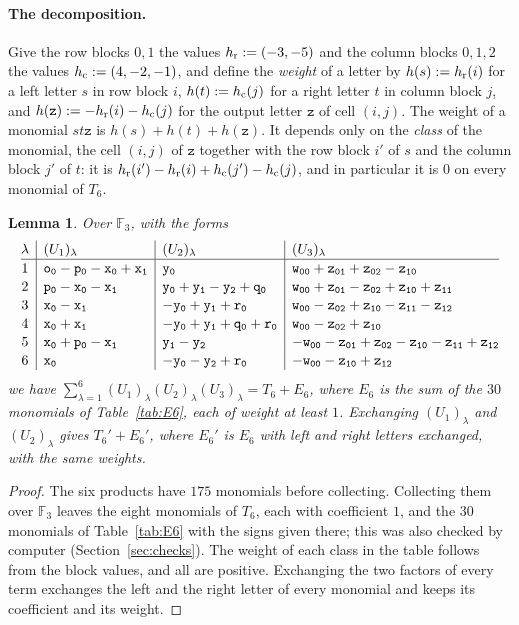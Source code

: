 \documentclass[11pt]{article}
\newtheorem{lemma}[theorem]{Lemma}
\theoremstyle{definition}
\theoremstyle{remark}
\newcommand{\F}{\mathbb{F}}
\newcommand{\tl}[1]{\mathtt{#1}}
\begin{document}
\paragraph{The decomposition.} Give the row blocks $0,1$ the values $h_{\rm r}:=(-3,-5)$ and the column blocks $0,1,2$ the values $h_{\rm c}:=(4,-2,-1)$, and define the \emph{weight} of a letter by $h(s):=h_{\rm r}(i)$ for a left letter $s$ in row block $i$, $h(t):=h_{\rm c}(j)$ for a right letter $t$ in column block $j$, and $h(\tl z):=-h_{\rm r}(i)-h_{\rm c}(j)$ for the output letter $\tl z$ of cell $(i,j)$. The weight of a monomial $st\tl z$ is $h(s)+h(t)+h(\tl z)$. It depends only on the \emph{class} of the monomial, the cell $(i,j)$ of $\tl z$ together with the row block $i'$ of $s$ and the column block $j'$ of $t$: it is $h_{\rm r}(i')-h_{\rm r}(i)+h_{\rm c}(j')-h_{\rm c}(j)$, and in particular it is $0$ on every monomial of $T_6$.

\begin{lemma}\label{lem:T6}
Over $\F_3$, with the forms
\[
\renewcommand{\arraystretch}{1.1}
\begin{array}{@{}c|l|l|l@{}}
\lambda&(U_1)_\lambda&(U_2)_\lambda&(U_3)_\lambda\\\hline
1&\tl{o_0}-\tl{p_0}-\tl{x_0}+\tl{x_1}&\tl{y_0}&\tl{w_{00}}+\tl{z_{01}}+\tl{z_{02}}-\tl{z_{10}}\\
2&\tl{p_0}-\tl{x_0}-\tl{x_1}&\tl{y_0}+\tl{y_1}-\tl{y_2}+\tl{q_0}&\tl{w_{00}}+\tl{z_{01}}-\tl{z_{02}}+\tl{z_{10}}+\tl{z_{11}}\\
3&\tl{x_0}-\tl{x_1}&-\tl{y_0}+\tl{y_1}+\tl{r_0}&\tl{w_{00}}-\tl{z_{02}}+\tl{z_{10}}-\tl{z_{11}}-\tl{z_{12}}\\
4&\tl{x_0}+\tl{x_1}&-\tl{y_0}+\tl{y_1}+\tl{q_0}+\tl{r_0}&\tl{w_{00}}-\tl{z_{02}}+\tl{z_{10}}\\
5&\tl{x_0}+\tl{p_0}-\tl{x_1}&\tl{y_1}-\tl{y_2}&-\tl{w_{00}}-\tl{z_{01}}+\tl{z_{02}}-\tl{z_{10}}-\tl{z_{11}}+\tl{z_{12}}\\
6&\tl{x_0}&-\tl{y_0}-\tl{y_2}+\tl{r_0}&-\tl{w_{00}}-\tl{z_{10}}+\tl{z_{12}}
\end{array}
\]
we have $\sum_{\lambda=1}^6(U_1)_\lambda(U_2)_\lambda(U_3)_\lambda=T_6+E_6$, where $E_6$ is the sum of the $30$ monomials of Table~\ref{tab:E6}, each of weight at least $1$. Exchanging $(U_1)_\lambda$ and $(U_2)_\lambda$ gives $T_6'+E_6'$, where $E_6'$ is $E_6$ with left and right letters exchanged, with the same weights.
\end{lemma}

\begin{proof}
The six products have $175$ monomials before collecting. Collecting them over $\F_3$ leaves the eight monomials of $T_6$, each with coefficient $1$, and the $30$ monomials of Table~\ref{tab:E6} with the signs given there; this was also checked by computer (Section~\ref{sec:checks}). The weight of each class in the table follows from the block values, and all are positive. Exchanging the two factors of every term exchanges the left and the right letter of every monomial and keeps its coefficient and its weight.
\end{proof}
\end{document}
